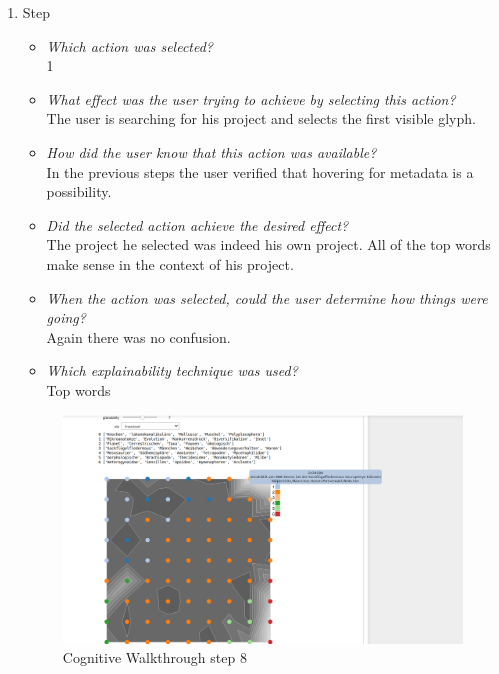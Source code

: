 {\begin{enumerate}
		\item Step
		\begin{itemize}
			\item \textit{Which action was selected?} \\
			1
			\item \textit{What effect was the user trying to achieve by selecting this action?} \\
			The user is searching for his project and selects the first visible glyph. 
			\item \textit{How did the user know that this action was available?} \\
			In the previous steps the user verified that hovering for metadata is a possibility. 
			\item \textit{Did the selected action achieve the desired effect?} \\
			The project he selected was indeed his own project. All of the top words make sense in the context of his project. 
			\item \textit{When the action was selected, could the user determine how things were going?} \\
			Again there was no confusion.
			\item \textit{Which explainability technique was used?}\\
			Top words
		\end{itemize}
		\begin{figure}[H]
			\centering
			\includegraphics[width=400px]{../chapters/validation/pics/6_c}
			\caption{\label{pic:step8} Cognitive Walkthrough step 8}
		\end{figure} \newpage
		

\end{enumerate}}
